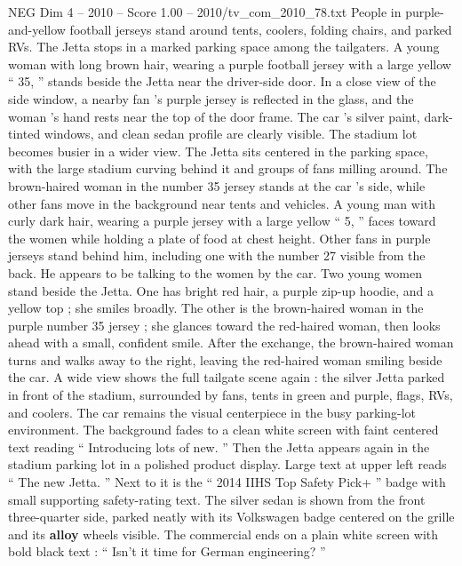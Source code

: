 \begin{textsample}{NEG Dim 4 – 2010 – Score 1.00 – 2010/tv\_com\_2010\_78.txt}
People in purple-and-yellow football jerseys stand around tents, coolers, folding chairs, and parked RVs.
The Jetta stops in a marked parking space among the tailgaters.
A young woman with long brown hair, wearing a purple football jersey with a large yellow “ 35, ” stands beside the Jetta near the driver-side door.
In a close view of the side window, a nearby fan ’s purple jersey is reflected in the glass, and the woman ’s hand rests near the top of the door frame.
The car ’s silver paint, dark-tinted windows, and clean sedan profile are clearly visible.
The stadium lot becomes busier in a wider view.
The Jetta sits centered in the parking space, with the large stadium curving behind it and groups of fans milling around.
The brown-haired woman in the number 35 jersey stands at the car ’s side, while other fans move in the background near tents and vehicles.
A young man with curly dark hair, wearing a purple jersey with a large yellow “ 5, ” faces toward the women while holding a plate of food at chest height.
Other fans in purple jerseys stand behind him, including one with the number 27 visible from the back.
He appears to be talking to the women by the car.
Two young women stand beside the Jetta.
One has bright red hair, a purple zip-up hoodie, and a yellow top ; she smiles broadly.
The other is the brown-haired woman in the purple number 35 jersey ; she glances toward the red-haired woman, then looks ahead with a small, confident smile.
After the exchange, the brown-haired woman turns and walks away to the right, leaving the red-haired woman smiling beside the car.
A wide view shows the full tailgate scene again : the silver Jetta parked in front of the stadium, surrounded by fans, tents in green and purple, flags, RVs, and coolers.
The car remains the visual centerpiece in the busy parking-lot environment.
The background fades to a clean white screen with faint centered text reading “ Introducing lots of new. ” Then the Jetta appears again in the stadium parking lot in a polished product display.
Large text at upper left reads “ The new Jetta. ” Next to it is the “ 2014 IIHS Top Safety Pick+ ” badge with small supporting safety-rating text.
The silver sedan is shown from the front three-quarter side, parked neatly with its Volkswagen badge centered on the grille and its \textbf{alloy} wheels visible.
The commercial ends on a plain white screen with bold black text : “ Isn't it time for German engineering? ”

\end{textsample}
